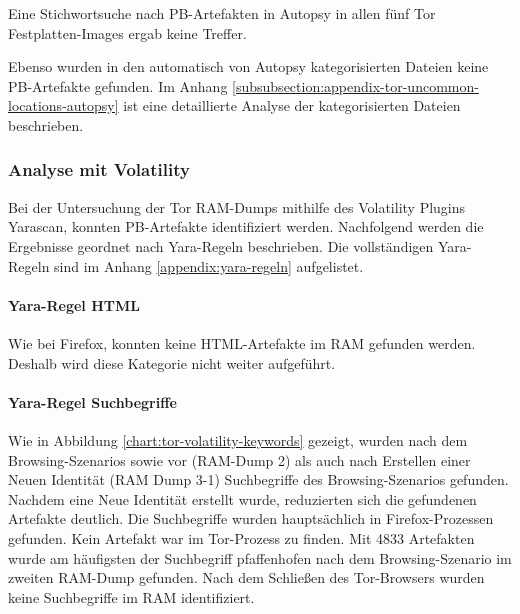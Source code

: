 Eine Stichwortsuche nach PB-Artefakten in Autopsy in allen fünf Tor Festplatten-Images ergab keine Treffer.

Ebenso wurden in den automatisch von Autopsy kategorisierten Dateien keine PB-Artefakte gefunden. 
Im Anhang \ref{subsubsection:appendix-tor-uncommon-locations-autopsy} ist eine detaillierte Analyse der kategorisierten Dateien beschrieben.


\subsubsection*{Analyse mit Volatility}
Bei der Untersuchung der Tor RAM-Dumps mithilfe des Volatility Plugins Yarascan, konnten PB-Artefakte identifiziert werden.
Nachfolgend werden die Ergebnisse geordnet nach Yara-Regeln beschrieben. Die vollständigen Yara-Regeln sind im Anhang \ref{appendix:yara-regeln} aufgelistet.

\paragraph*{Yara-Regel \glqq{}HTML\grqq{}}
Wie bei Firefox, konnten keine HTML-Artefakte im RAM gefunden werden. Deshalb wird diese Kategorie nicht weiter aufgeführt.

\paragraph*{Yara-Regel \glqq{}Suchbegriffe\grqq{}}
Wie in Abbildung \ref{chart:tor-volatility-keywords} gezeigt, wurden nach dem Browsing-Szenarios sowie vor (RAM-Dump 2) als auch nach Erstellen einer \glqq{}Neuen Identität\grqq{} (RAM Dump 3-1) Suchbegriffe des Browsing-Szenarios gefunden.
Nachdem eine \glqq{}Neue Identität\grqq{} erstellt wurde, reduzierten sich die gefundenen Artefakte deutlich. 
Die Suchbegriffe wurden hauptsächlich in Firefox-Prozessen gefunden. Kein Artefakt war im Tor-Prozess zu finden.
Mit 4833 Artefakten wurde am häufigsten der Suchbegriff \glqq{}pfaffenhofen\grqq{} nach dem Browsing-Szenario im zweiten RAM-Dump gefunden. 
Nach dem Schließen des Tor-Browsers wurden keine Suchbegriffe im RAM identifiziert.

